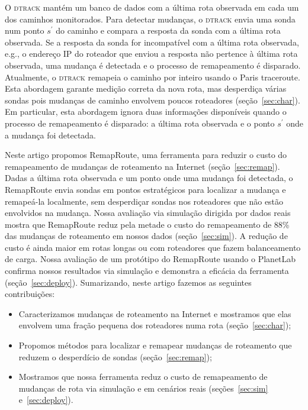 \documentclass{JBCS}
\newcommand{\dtrack}{\textsc{dtrack}}
\newcommand{\rmprt}{{Re\-map\-Rou\-te}}
\newcommand{\secstr}{seção}
\newcommand{\secstrs}{seções}
\begin{document}
O \dtrack{} mantém um banco de dados com a última rota observada em cada
um dos caminhos monitorados.  Para detectar mudanças, o \dtrack{} envia
uma sonda num ponto $s^\prime$ do caminho e compara a resposta da sonda
com a última rota observada.  Se a resposta da sonda for incompatível
com a última rota observada, e.g., o endereço IP do roteador que enviou
a resposta não pertence à última rota observada, uma mudança é detectada
e o processo de remapeamento é disparado.  Atualmente, o \dtrack{}
remapeia o caminho por inteiro usando o Paris traceroute.  Esta
abordagem garante medição correta da nova rota, mas desperdiça várias
sondas pois mudanças de caminho envolvem poucos roteadores
(\secstr~\ref{sec:char}).  Em particular, esta abordagem ignora duas
informações disponíveis quando o processo de remapeamento é disparado: a
última rota observada e o ponto $s^\prime$ onde a mudança foi detectada.

Neste artigo propomos \rmprt{}, uma ferramenta para reduzir o custo do
remapeamento de mudanças de roteamento na Internet
(seção~\ref{sec:remap}).  Dadas a última rota observada e um ponto onde
uma mudança foi detectada, o \rmprt{} envia sondas em pontos
estratégicos para localizar a mudança e remapeá-la localmente, sem
desperdiçar sondas nos roteadores que não estão envolvidos na mudança.
Nossa avaliação via simulação dirigida por dados reais mostra que
\rmprt{} reduz pela metade o custo do remapeamento de 88\% das mudanças
de roteamento em nossos dados (seção~\ref{sec:sim}).  A redução de custo
é ainda maior em rotas longas ou com roteadores que fazem balanceamento
de carga.  Nossa avaliação de um protótipo do \rmprt{} usando o
PlanetLab confirma nossos resultados via simulação e demonstra a
eficácia da ferramenta (\secstr~\ref{sec:deploy}).  Sumarizando, neste
artigo fazemos as seguintes contribuições:

\begin{itemize}

\item Caracterizamos mudanças de roteamento na Internet e mostramos que
elas envolvem uma fração pequena dos roteadores numa rota
(\secstr~\ref{sec:char});

\item Propomos métodos para localizar e remapear mudanças de roteamento
que reduzem o desperdício de sondas (\secstr~\ref{sec:remap});

\item Mostramos que nossa ferramenta reduz o custo de remapeamento de
mudanças de rota via simulação e em cenários reais
(\secstrs~\ref{sec:sim} e~\ref{sec:deploy}).

\end{itemize}
\end{document}
